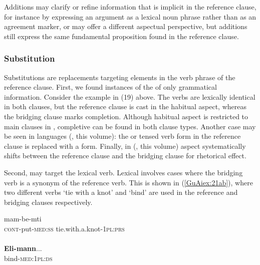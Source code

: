 \documentclass[output=paper]{LSP/langsci}
\begin{document}
Additions may clarify or refine information that is implicit in the reference clause, for instance by expressing an argument as a lexical noun phrase rather than as an agreement marker, or may offer a different aspectual perspective, but additions still express the same fundamental proposition found in the reference clause.

\subsubsection{Substitution}
\label{GuAi314subst}
Substitutions are replacements targeting elements in the verb phrase of the reference clause. First, we found instances of the  of only grammatical information. Consider the  example in (19) above. The verbs are lexically identical in both clauses, but the reference clause is cast in the habitual aspect, whereas the bridging clause marks completion. Although habitual aspect is restricted to main clauses in , completive can be found in both clause types. Another case may be seen in  languages (\citeauthor{anker18}, this volume): the  or tensed verb form in the reference clause is replaced with a  form. Finally, in  (\citeauthor{jarkey18}, this volume) aspect systematically shifts between the reference clause and the bridging clause for rhetorical effect.

Second,  may target the lexical verb. Lexical  involves cases where the bridging verb is a synonym of the reference verb. This is shown in (\ref{GuAiex:21ab}), where two different verbs `tie with a knot' and `bind' are used in the reference and bridging clauses respectively. 
\pagebreak

\begin{exe}
\ex \label{GuAiex:21ab}
\begin{xlist}
\ex \label{GuAiex:21a}
\gll mam-be-mti     \underline{}\\
\textsc{cont}-put-\textsc{med:ss}   tie.with.a.knot-\textsc{1pl:prs} \\
\glt {} \\
\ex \label{GuAiex:21b}
\gll  \textbf{Eli-mann}...\\
bind-\textsc{med:1pl:ds}\\
\glt {}
\end{xlist}
\end{exe}
\end{document}
